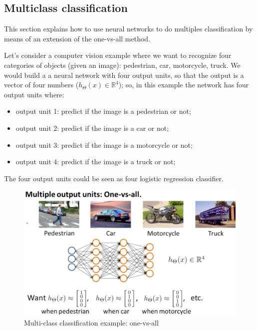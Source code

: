 \subsection{Multiclass classification}
This section explains how to use neural networks to do multiples classification by means of an extension of the one-vs-all method. 

Let's consider a computer vision example where we want to recognize four categories of objects (given an image): pedestrian, car, motorcycle, truck.
We would build a a neural network with four output units, so that the output is a vector of four numbers ($h_\Theta(x) \in \mathbb{R}^4$); so, in this example the network has four output units where:

\begin{itemize}
\item output unit 1: predict if the image is a pedestrian or not;
\item output unit 2: predict if the image is a car or not;
\item output unit 3: predict if the image is a motorcycle or not;
\item output unit 4: predict if the image is a truck or not;
\end{itemize}


The four output units could be seen as four logistic regression classifier.

\begin{figure}[H]
\begin{center}
\includegraphics[scale=0.25]{images/one-vs-all-ex}
\end{center}
\caption{Multi-class classification example: one-vs-all } 
\label{xor1}
\end{figure}

